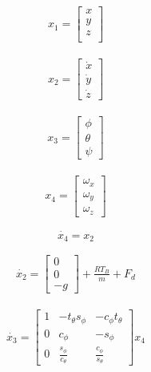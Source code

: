 \documentclass[9pt]{article}
\begin{document}
\begin{eqnarray}
x_{1} =
\left[
\begin{matrix}
x \\
y \\
z \\
\end{matrix}
\right]
\end{eqnarray}

\begin{eqnarray}
x_{2} =
\left[
\begin{matrix}
\dot{x} \\
\dot{y} \\
\dot{z}
\end{matrix}
\right]
\end{eqnarray}

\begin{eqnarray}
x_{3} =
\left[
\begin{matrix}
\phi \\
\theta \\ 
\psi
\end{matrix}
\right]
\end{eqnarray}

\begin{eqnarray}
x_{4} =
\left[
\begin{matrix}
\omega_{x} \\
\omega_{y} \\
\omega_{z}
\end{matrix}
\right]
\end{eqnarray}

\begin{equation}
\dot{x_{4}} = x_{2}
\end{equation}

\begin{eqnarray}
\dot{x_{2}} =
\left[
\begin{matrix}
0 \\
0 \\
-g
\end{matrix}
\right]+
\frac{RT_{B}}{m} + F_{d}
\end{eqnarray}

\begin{eqnarray}
\dot{x_{3}} = 
\left[
\begin{matrix}
1 & -t_{\theta}s_{\phi} & -c_{\phi}t_{\theta}   \\
0 & c_{\phi} & -s_{\phi}   \\
0 & \frac{s_{\phi}}{c_{\theta}} & \frac{c_{\phi}}{s_{\theta}}
\end{matrix}
\right]
x_{4}
\end{eqnarray}
\end{document}
